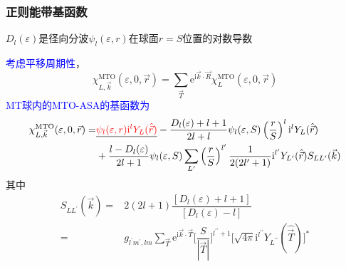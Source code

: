 \documentclass[cjk,slidestop,compress,mathserif,blue]{beamer}
\begin{document}
\frame
{
	\frametitle{正则能带基函数}
	$D_l(\varepsilon)$是径向分波$\psi_l(\varepsilon,r)$在球面$r=S$位置的对数导数

	\textcolor{blue}{考虑平移周期性}，
$$\chi_{L,\vec k}^{\mathrm{MTO}}(\varepsilon,0,\vec r)=\sum_{\vec T}\mathrm{e}^{\mathrm{i}\vec k\cdot\vec R}\chi_L^{\mathrm{MTO}}(\varepsilon,0,\vec r)$$
\textcolor{blue}{\textrm{MT}球内的\textrm{MTO-ASA}的基函数为}
{\fontsize{9.0pt}{5.2pt}\selectfont
\begin{displaymath}
	\begin{aligned}
		\chi_{L,\vec k}^{\mathrm{MTO}}(\varepsilon,0,\vec r)=&\underline{\textcolor{red}{\psi_l(\varepsilon,r)\mathrm{i}^lY_L(\hat{\vec r})}}-\dfrac{D_l(\varepsilon)+l+1}{2l+l}\psi_l(\varepsilon,S)\left(\dfrac rS\right)^l\mathrm{i}^lY_L(\hat{\vec r})\\
		&+\dfrac{l-D_l(\varepsilon)}{2l+1}\psi_l(\varepsilon,S)\sum_{L^{\prime}}\left(\dfrac rS\right)^{l^{\prime}}\dfrac1{2(2l^{\prime}+1)}\mathrm{i}^{l^{\prime}}Y_{L^{\prime}}(\hat{\vec r})S_{LL^{\prime}}(\vec k)
	\end{aligned}
\end{displaymath}}
其中
\begin{displaymath}
	\begin{aligned}
		S_{LL^{\prime}}(\vec k)=&2(2l+1)\dfrac{[D_l(\varepsilon)+l+1]}{[D_l(\varepsilon)-l]}\\
		=&g_{l^{\prime}m^{\prime},lm}\sum_{\vec T}\mathrm{e}^{\mathrm{i}\vec k\cdot\vec T}\bigg[\dfrac S{|\vec T|}\bigg]^{l^{\prime\prime}+1}\big[\sqrt{4\pi}\mathrm{i}^{l^{\prime\prime}}Y_{L^{\prime\prime}}(\hat{\vec T})\big]^{\ast}
	\end{aligned}
\end{displaymath}
}
\end{document}
